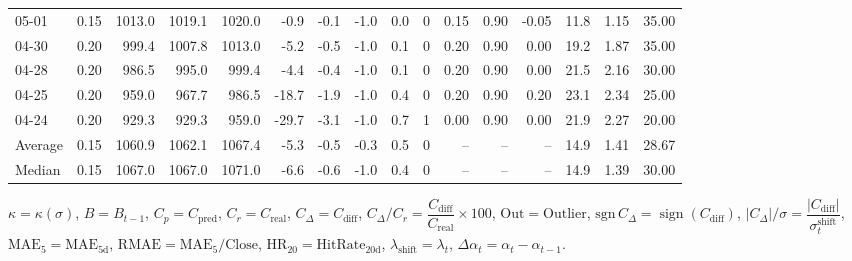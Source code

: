 \begin{threeparttable}
{\begin{tabular}{lrrrrrrrrrrrrrrr}
  05-01 &     0.15 & 1013.0 & 1019.1 & 1020.0 &       -0.9 &           -0.1 &                     -1.0 &                 0.0 &              0 &       0.15 &      0.90 &          -0.05 &             11.8 &            1.15 &                  35.00 \\
  04-30 &     0.20 &  999.4 & 1007.8 & 1013.0 &       -5.2 &           -0.5 &                     -1.0 &                 0.1 &              0 &       0.20 &      0.90 &           0.00 &             19.2 &            1.87 &                  35.00 \\
  04-28 &     0.20 &  986.5 &  995.0 &  999.4 &       -4.4 &           -0.4 &                     -1.0 &                 0.1 &              0 &       0.20 &      0.90 &           0.00 &             21.5 &            2.16 &                  30.00 \\
  04-25 &     0.20 &  959.0 &  967.7 &  986.5 &      -18.7 &           -1.9 &                     -1.0 &                 0.4 &              0 &       0.20 &      0.90 &           0.20 &             23.1 &            2.34 &                  25.00 \\
  04-24 &     0.20 &  929.3 &  929.3 &  959.0 &      -29.7 &           -3.1 &                     -1.0 &                 0.7 &              1 &       0.00 &      0.90 &           0.00 &             21.9 &            2.27 &                  20.00 \\
Average &     0.15 & 1060.9 & 1062.1 & 1067.4 &       -5.3 &           -0.5 &                     -0.3 &                 0.5 &              0 &         -- &        -- &             -- &             14.9 &            1.41 &                  28.67 \\
 Median &     0.15 & 1067.0 & 1067.0 & 1071.0 &       -6.6 &           -0.6 &                     -1.0 &                 0.4 &              0 &         -- &        -- &             -- &             14.9 &            1.39 &                  30.00 \\
\bottomrule
\end{tabular}
}
\begin{tablenotes}\footnotesize
\item $\kappa=\kappa(\sigma)$, $B=B_{t-1}$, $C_p=C_{\text{pred}}$, $C_r=C_{\text{real}}$, $C_\Delta=C_{\text{diff}}$, $C_\Delta/C_r=\dfrac{C_{\text{diff}}}{C_{\text{real}}}\times100$, $\mathrm{Out}=\text{Outlier}$, $\mathrm{sgn}\,C_\Delta=\operatorname{sign}(C_{\text{diff}})$, $|C_\Delta|/\sigma=\dfrac{|C_{\text{diff}}|}{\sigma_t^{\text{shift}}}$, $\mathrm{MAE}_5=\mathrm{MAE}_{5\text{d}}$, $\mathrm{RMAE}= \mathrm{MAE}_5 / \text{Close}$, $\mathrm{HR}_{20}=\mathrm{HitRate}_{20\text{d}}$, 
$\lambda_{\text{shift}}=\lambda_t$, 
$\Delta\alpha_t=\alpha_t-\alpha_{t-1}$.
\end{tablenotes}
\end{threeparttable}
\endgroup

